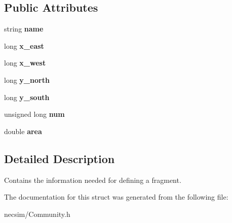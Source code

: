 \subsection*{Public Attributes}
\begin{DoxyCompactItemize}
\item 
string {\bfseries name}\hypertarget{struct_fragment_acf92da0ecedecb7080adf56e35543636}{}\label{struct_fragment_acf92da0ecedecb7080adf56e35543636}

\item 
long {\bfseries x\+\_\+east}\hypertarget{struct_fragment_a0257d6b1942656e4181eab82cc5392c4}{}\label{struct_fragment_a0257d6b1942656e4181eab82cc5392c4}

\item 
long {\bfseries x\+\_\+west}\hypertarget{struct_fragment_aabfd09652d5abae4b6393fd40e6d3d9d}{}\label{struct_fragment_aabfd09652d5abae4b6393fd40e6d3d9d}

\item 
long {\bfseries y\+\_\+north}\hypertarget{struct_fragment_a1d792c8e975cbc9405ece3a90a283c4f}{}\label{struct_fragment_a1d792c8e975cbc9405ece3a90a283c4f}

\item 
long {\bfseries y\+\_\+south}\hypertarget{struct_fragment_a71d7c613d71459b72158ef80ba705bfc}{}\label{struct_fragment_a71d7c613d71459b72158ef80ba705bfc}

\item 
unsigned long {\bfseries num}\hypertarget{struct_fragment_ac966a3ac928cba2706ca9c87f159d1ee}{}\label{struct_fragment_ac966a3ac928cba2706ca9c87f159d1ee}

\item 
double {\bfseries area}\hypertarget{struct_fragment_ad37e6d449d9b0b1273e712e5a4da2887}{}\label{struct_fragment_ad37e6d449d9b0b1273e712e5a4da2887}

\end{DoxyCompactItemize}


\subsection{Detailed Description}
Contains the information needed for defining a fragment. 

The documentation for this struct was generated from the following file\+:\begin{DoxyCompactItemize}
\item 
necsim/Community.\+h\end{DoxyCompactItemize}
